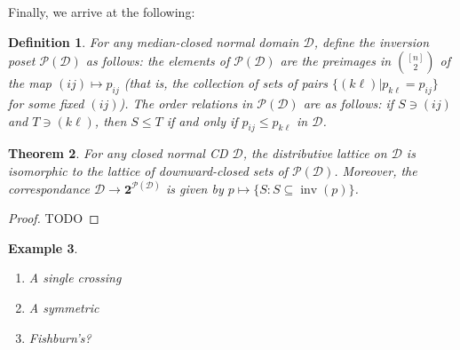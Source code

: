 \documentclass[12pt]{article}
\newtheorem{theorem}{Theorem}
\newtheorem{definition}[theorem]{Definition}
\newtheorem{example}[theorem]{Example}
\newcommand{\D}{\mathcal{D}}
\newcommand{\PP}{\mathcal{P}}
\newcommand{\PowerSet}[1]{\mathbf{2}^{#1}}
\DeclareMathOperator*{\inv}{inv}
\newcommand{\1}[1]{\mathds{1}[{#1}]}
\begin{document}
  Finally, we arrive at the following:
  \begin{definition}
    For any median-closed normal domain $\D$,
    define the \emph{inversion poset} $\PP(\D)$ as follows:
    the elements of $\PP(\D)$ are the preimages in $[n]\choose 2$
    of the map $(ij)\mapsto p_{ij}$ (that is, the collection of sets of pairs
    $\{(k\ell) | p_{k\ell}=p_{ij}\}$ for some fixed $(ij)$).
    The order relations in $\PP(\D)$ are as follows:
    if $S\ni (ij)$ and $T\ni (k\ell)$, then 
    $S\le T$ if and only if $p_{ij}\le p_{k\ell}$ in $\D$.
  \end{definition}
  \begin{theorem}\label{thrmBijectDownsets}
    For any closed normal CD $\D$, the distributive lattice on $\D$ is
    isomorphic to the lattice of downward-closed sets of $\PP(\D)$.
    Moreover, the correspondance $\D\to\PowerSet{\PP(\D)}$ is
    given by $p\mapsto \{S : S\subseteq \inv(p)\}$.
  \end{theorem}
  \begin{proof}
    TODO
  \end{proof}

  \begin{example}
    \begin{enumerate}
      \item A single crossing
      \item A symmetric
      \item Fishburn's?
    \end{enumerate}
  \end{example}
\end{document}
